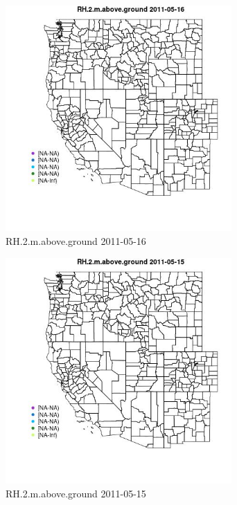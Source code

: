 \begin{figure} 
\centering  
\includegraphics[width=0.77\textwidth]{Code_Outputs/ML_input_report_ML_input_PM25_Step5_part_d_de_duplicated_aves_ML_input_MapObsRH2maboveground2011-05-16.jpg} 
\caption{\label{fig:ML_input_report_ML_input_PM25_Step5_part_d_de_duplicated_aves_ML_inputMapObsRH2maboveground2011-05-16}RH.2.m.above.ground 2011-05-16} 
\end{figure} 
 

\begin{figure} 
\centering  
\includegraphics[width=0.77\textwidth]{Code_Outputs/ML_input_report_ML_input_PM25_Step5_part_d_de_duplicated_aves_ML_input_MapObsRH2maboveground2011-05-15.jpg} 
\caption{\label{fig:ML_input_report_ML_input_PM25_Step5_part_d_de_duplicated_aves_ML_inputMapObsRH2maboveground2011-05-15}RH.2.m.above.ground 2011-05-15} 
\end{figure} 
 

